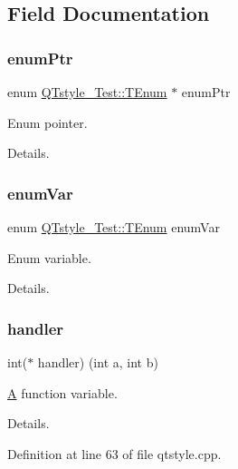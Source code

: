 \subsection{Field Documentation}
\mbox{\label{class_q_tstyle___test_ab4ffc353b47d656f895ed0fabb3037f1}} 
\subsubsection{\texorpdfstring{enum\+Ptr}{enumPtr}}
{\footnotesize\ttfamily enum \hyperlink{class_q_tstyle___test_a33e3643b66dfa91e4fb7cc663a23e166}{Q\+Tstyle\+\_\+\+Test\+::\+T\+Enum}
         $\ast$ enum\+Ptr}



Enum pointer. 

Details. \mbox{\label{class_q_tstyle___test_a4a746447ffdce1c671760d032b6352bd}} 
\subsubsection{\texorpdfstring{enum\+Var}{enumVar}}
{\footnotesize\ttfamily enum \hyperlink{class_q_tstyle___test_a33e3643b66dfa91e4fb7cc663a23e166}{Q\+Tstyle\+\_\+\+Test\+::\+T\+Enum}
          enum\+Var}



Enum variable. 

Details. \mbox{\label{class_q_tstyle___test_a83e6d7b763dc413e96b0c435a1d29a5d}} 
\subsubsection{\texorpdfstring{handler}{handler}}
{\footnotesize\ttfamily int($\ast$ handler) (int a, int b)}



\hyperlink{class_a}{A} function variable. 

Details. 

Definition at line 63 of file qtstyle.\+cpp.

